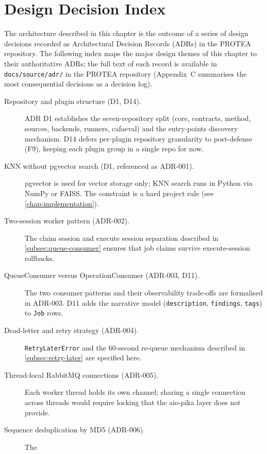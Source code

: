 \section{Design Decision Index}
\label{sec:adr-index}

The architecture described in this chapter is the outcome of a series of design
decisions recorded as Architectural Decision Records (ADRs) in the PROTEA
repository. The following index maps the major design themes of this chapter to
their authoritative ADRs; the full text of each record is available in
\texttt{docs/source/adr/} in the PROTEA repository (Appendix~C summarises the
most consequential decisions as a decision log).

\begin{description}
  \item[Repository and plugin structure (D1, D14).] ADR D1 establishes the
    seven-repository split (core, contracts, method, sources, backends, runners,
    cafaeval) and the entry-points discovery mechanism. D14 defers per-plugin
    repository granularity to post-defense (F9), keeping each plugin group in a
    single repo for now.
  \item[KNN without pgvector search (D1, referenced as ADR-001).] pgvector is
    used for vector storage only; KNN search runs in Python via NumPy or FAISS.
    The constraint is a hard project rule (see \cref{chap:implementation}).
  \item[Two-session worker pattern (ADR-002).] The claim session and execute
    session separation described in \cref{subsec:queue-consumer} ensures that
    job claims survive execute-session rollbacks.
  \item[QueueConsumer versus OperationConsumer (ADR-003, D11).] The two consumer
    patterns and their observability trade-offs are formalised in ADR-003.
    D11 adds the narrative model (\texttt{description}, \texttt{findings},
    \texttt{tags}) to \texttt{Job} rows.
  \item[Dead-letter and retry strategy (ADR-004).] \texttt{RetryLaterError} and
    the 60-second re-queue mechanism described in \cref{subsec:retry-later} are
    specified here.
  \item[Thread-local RabbitMQ connections (ADR-005).] Each worker thread holds
    its own channel; sharing a single connection across threads would require
    locking that the aio-pika layer does not provide.
  \item[Sequence deduplication by MD5 (ADR-006).] The

\end{description}
